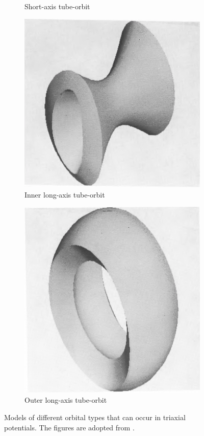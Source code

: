 \documentclass[english, twoside]{HYgradu}
\begin{document}
\begin{figure}
\begin{subfigure}[b]{0.49\textwidth}
		\caption{Short-axis tube-orbit}
	\end{subfigure}
	\begin{subfigure}[b]{0.49\textwidth}
		\includegraphics[width=\textwidth]{statler_long_inner.png}
		\caption{Inner long-axis tube-orbit}
	\end{subfigure}
	\begin{subfigure}[b]{0.49\textwidth}
		\includegraphics[width=\textwidth]{statler_long_outer.png}
		\caption{Outer long-axis tube-orbit}
	\end{subfigure}
	\caption{Models of different orbital types that can occur in triaxial potentials. The figures are adopted from \cite{Statler1987}.}
	\label{figure:triaxial_orbits}
\end{figure}
\end{document}
